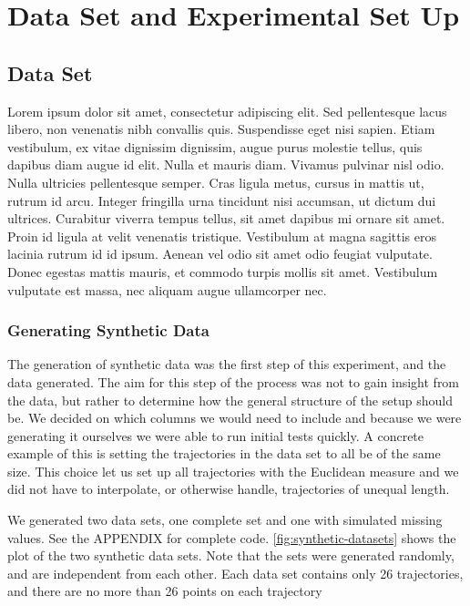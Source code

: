 \chapter{Data Set and Experimental Set Up}

\section{Data Set}

Lorem ipsum dolor sit amet, consectetur adipiscing elit. 
Sed pellentesque lacus libero, non venenatis nibh convallis quis. Suspendisse eget nisi sapien. 
Etiam vestibulum, ex vitae dignissim dignissim, augue purus molestie tellus, quis dapibus diam augue id elit. Nulla et mauris diam. Vivamus pulvinar nisl odio. Nulla ultricies pellentesque semper. 
Cras ligula metus, cursus in mattis ut, rutrum id arcu. Integer fringilla urna tincidunt nisi accumsan, ut dictum dui ultrices. 
Curabitur viverra tempus tellus, sit amet dapibus mi ornare sit amet. Proin id ligula at velit venenatis tristique. Vestibulum at magna sagittis eros lacinia rutrum id id ipsum. 
Aenean vel odio sit amet odio feugiat vulputate. Donec egestas mattis mauris, et commodo turpis mollis sit amet. Vestibulum vulputate est massa, nec aliquam augue ullamcorper nec.

\subsection{Generating Synthetic Data}

The generation of synthetic data was the first step of this experiment, and the data generated.
The aim for this step of the process was not to gain insight from the data, but rather to determine how the general structure of the setup should be.
We decided on which columns we would need to include and because we were generating it ourselves we were able to run initial tests quickly. 
A concrete example of this is setting the trajectories in the data set to all be of the same size. This choice let us set up all trajectories with the Euclidean measure and we did not have to interpolate, or otherwise handle, trajectories of unequal length. 



We generated two data sets, one complete set and one with simulated missing values. See the APPENDIX for complete code. \autoref{fig:synthetic-datasets} shows the plot of the two synthetic data sets. Note that the sets were generated randomly, and are independent from each other. Each data set contains only 26 trajectories, and there are no more than 26 points on each trajectory


